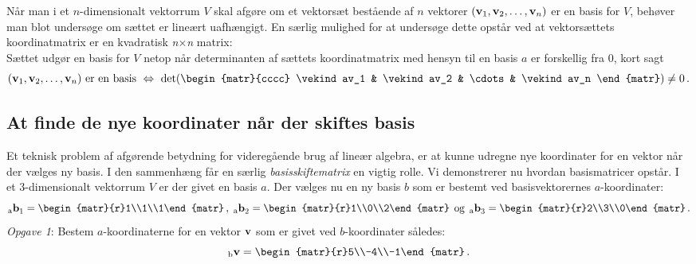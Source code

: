 \begin{method}\label{tn7.methBasis}
Når man i et $n$-dimensionalt vektorrum $V$ skal afgøre om et vektorsæt bestående af $n$ vektorer $(\mathbf{v}_1,\mathbf{v}_2,\ldots,\mathbf{v}_n)$ er en basis for $V$, behøver man blot undersøge om sættet er lineært uafhængigt. En særlig mulighed for at undersøge dette opstår ved at vektorsættets koordinatmatrix er en kvadratisk \textit{n}$\times$\textit{n} matrix:
\medskip\\
Sættet udgør en basis for $V$ netop når determinanten af sættets koordinatmatrix med hensyn til en basis $a$ er forskellig fra $0$, kort sagt
\begin{equation}
(\mv_1,\mv_2,\ldots,\mv_n)\,\,\mathrm{er}\,\,\mathrm{en}\,\,\mathrm{basis}
\,\,
\Leftrightarrow\,\,
\mathrm{det}\!\left(\begin{matr}{cccc} \vekind av_1 & \vekind av_2 & \cdots & \vekind av_n \end{matr} \right)\neq 0\,.
\end{equation}
\end{method}

\subsection{At finde de nye koordinater når der skiftes basis} \label{tn7.secbasisskifte}

Et teknisk problem af afgørende betydning for videregående brug af lineær algebra, er at kunne udregne nye koordinater for en vektor når der vælges ny basis. I den sammenhæng får en særlig \textit{basisskiftematrix} en vigtig rolle. Vi demonstrerer nu hvordan basismatricer opstår.\bs
I et 3-dimensionalt vektorrum $V$ er der givet en basis $a$. Der vælges nu en ny basis $b$ som er bestemt ved basisvektorernes $a$-koordinater:
$$
\vekind ab_1=\begin{matr}{r}1\\1\\1\end{matr}\,,\;
\vekind ab_2=\begin{matr}{r}1\\0\\2\end{matr}\,\;\mathrm{og}\,\;
\vekind ab_3=\begin{matr}{r}2\\3\\0\end{matr}\,.
$$
\textit{Opgave 1}: Bestem $a$-koordinaterne for en vektor $\mathbf{v}$ som er givet ved $b$-koordinater således:
\begin{equation}\label{tn7.bkoordGivet}
\vekind bv=\begin{matr}{r}5\\-4\\-1\end{matr}\,.
\end{equation}

